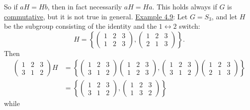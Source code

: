 \noindent So if $aH = Hb$, then in fact necessarily $aH = Ha$. This holds always if $G$ is \underline{commutative}, but it is not true in general.
\noindent\underline{Example 4.9}: Let $G = S_3$, and let $H$ be the subgroup consisting of the identity and the $1 \longleftrightarrow 2$ switch:
$$H = \left\{ \begin{pmatrix} 1 & 2 & 3 \\ 1 & 2 & 3 \end{pmatrix}, \begin{pmatrix} 1 & 2 & 3 \\ 2 & 1 & 3 \end{pmatrix} \right\}.$$
Then
\begin{align*}
\begin{pmatrix} 1 & 2 & 3 \\ 3 & 1 & 2 \end{pmatrix} H &= \left\{ \begin{pmatrix} 1 & 2 & 3 \\ 3 & 1 & 2 \end{pmatrix}\begin{pmatrix} 1 & 2 & 3 \\ 1 & 2 & 3 \end{pmatrix}, \begin{pmatrix} 1 & 2 & 3 \\ 3 & 1 & 2 \end{pmatrix}\begin{pmatrix} 1 & 2 & 3 \\ 2 & 1 & 3 \end{pmatrix} \right\} \\
&= \left\{ \begin{pmatrix} 1 & 2 & 3 \\ 3 & 1 & 2 \end{pmatrix}, \begin{pmatrix} 1 & 2 & 3 \\ 1 & 3 & 2 \end{pmatrix} \right\}
\end{align*}
while
